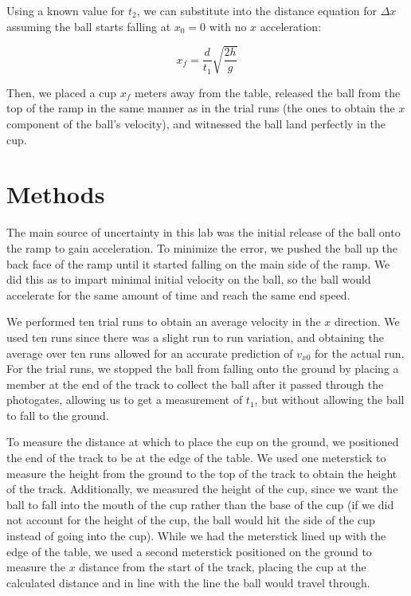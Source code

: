 \documentclass[12pt]{article}
\begin{document}
Using a known value for \(t_2\), we can substitute into the distance equation for \(\Delta x\) assuming the ball starts falling at \(x_0 = 0\) with no \(x\) acceleration:

\begin{equation} \label{xf-eqn}
x_{f} = \frac{d}{t_{1}}\sqrt{\frac{2h}{g}}
\end{equation}

Then, we placed a cup \(x_f\) meters away from the table, released the ball from the top of the ramp in the same manner as in the trial runs (the ones to obtain the \(x\) component of the ball's velocity), and witnessed the ball land perfectly in the cup.
\section{Methods}
\label{sec:orgaa4fbb6}

The main source of uncertainty in this lab was the initial release of the ball onto the ramp to gain acceleration. To minimize the error, we pushed the ball up the back face of the ramp until it started falling on the main side of the ramp. We did this as to impart minimal initial velocity on the ball, so the ball would accelerate for the same amount of time and reach the same end speed.

We performed ten trial runs to obtain an average velocity in the \(x\) direction. We used ten runs since there was a slight run to run variation, and obtaining the average over ten runs allowed for an accurate prediction of \(v_{x0}\) for the actual run. For the trial runs, we stopped the ball from falling onto the ground by placing a member at the end of the track to collect the ball after it passed through the photogates, allowing us to get a measurement of \(t_1\), but without allowing the ball to fall to the ground.

To measure the distance at which to place the cup on the ground, we positioned the end of the track to be at the edge of the table. We used one meterstick to measure the height from the ground to the top of the track to obtain the height of the track. Additionally, we measured the height of the cup, since we want the ball to fall into the mouth of the cup rather than the base of the cup (if we did not account for the height of the cup, the ball would hit the side of the cup instead of going into the cup). While we had the meterstick lined up with the edge of the table, we used a second meterstick positioned on the ground to measure the \(x\) distance from the start of the track, placing the cup at the calculated distance and in line with the line the ball would travel through.
\end{document}
